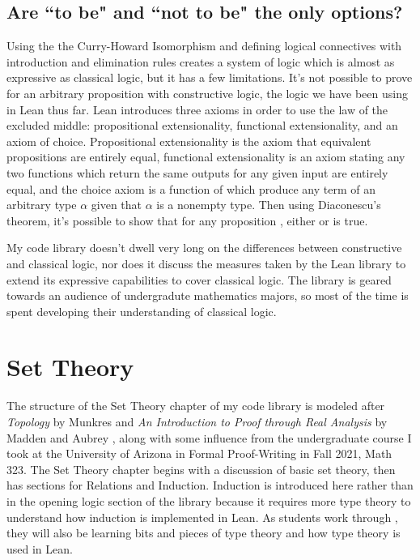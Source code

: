 \subsection{Are ``to be" and ``not to be" the only options?}

Using the the Curry-Howard Isomorphism and defining logical connectives
with introduction and elimination rules creates a system of logic which
is almost as expressive as classical logic, but it has a few limitations.
It's not possible to prove  for an arbitrary proposition 
with constructive logic, the logic we have been using in Lean thus far.
Lean introduces three axioms in order to use the law of the
excluded middle: propositional extensionality, functional
extensionality, and an axiom of choice. Propositional extensionality is the
axiom that equivalent propositions are entirely equal, functional extensionality
is an axiom stating any two functions which return the same outputs for any
given input are entirely equal, and the choice axiom is a function of which produce
any term of an arbitrary type $\alpha$ given that $\alpha$ is a nonempty
type. Then using Diaconescu's theorem, it's possible to show that for any
proposition , either  or  is true. 

My code library doesn't dwell very long on the differences between 
constructive and classical logic, nor does it discuss the measures
taken by the Lean library to extend its expressive capabilities to 
cover classical logic. The library is geared towards an audience of 
undergradute mathematics majors, so most of the time is spent developing
their understanding of classical logic.

\section{Set Theory}

The structure of the Set Theory chapter of my code library is modeled after 
\textit{Topology} by Munkres \cite{Munkres} and 
\textit{An Introduction to Proof through Real Analysis} 
by Madden and Aubrey \cite{RealAnalysis}, along with
some influence from the undergraduate course I took at the University of Arizona
in Formal Proof-Writing in Fall 2021, Math 323. 
The Set Theory chapter  begins with a discussion of basic
set theory, then has sections for Relations and Induction. 
Induction is introduced here rather than in the opening logic section of the 
library because it requires more type theory to understand how induction is
implemented in Lean. As students work through ,
they will also be learning bits and pieces of type theory and how type theory
is used in Lean. 

